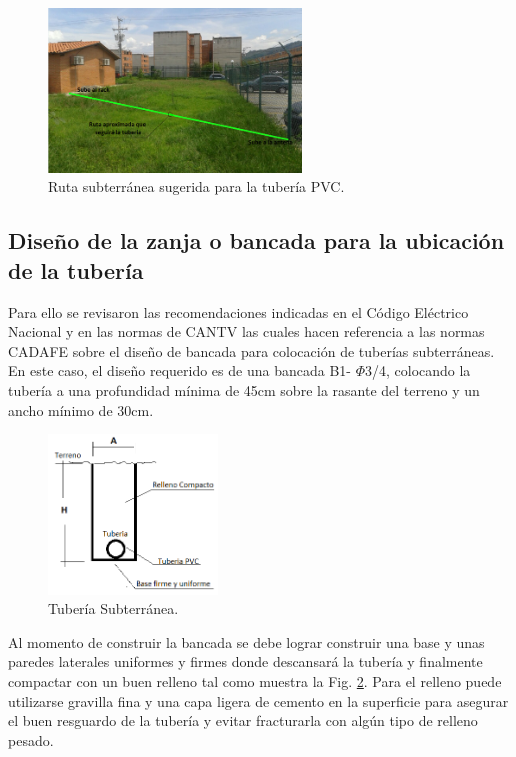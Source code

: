 \documentclass[11pt, a4paper, twosides]{report}
\begin{document}
\begin{figure}[h]
    \centering
    \includegraphics[width=0.6\textwidth]{Si1.png}
    \caption{Ruta subterránea sugerida para la tubería PVC.}
    \label{fig:frog1}
\end{figure}


\subsection{Diseño de la zanja o bancada para la ubicación de la tubería}
Para ello se revisaron las recomendaciones indicadas en el Código Eléctrico Nacional y en las normas de CANTV las cuales hacen referencia a las normas CADAFE sobre el diseño de bancada para colocación de tuberías subterráneas. En este caso, el diseño requerido es de una bancada B1- $\Phi$3/4, colocando la tubería a una profundidad mínima de 45cm sobre la rasante del terreno y un ancho mínimo de 30cm. 

\begin{figure}[h]
    \centering
    \includegraphics[width=0.4\textwidth]{Si3.png}
    \caption{Tubería Subterránea.}
    \label{fig:frog2}
\end{figure}

Al momento de construir la bancada se debe lograr construir una base y unas paredes laterales uniformes y firmes donde descansará la tubería y finalmente compactar con un buen relleno tal como muestra la Fig. \ref{fig:frog2}. Para el relleno puede utilizarse gravilla fina y una capa ligera de cemento en la superficie para asegurar el buen resguardo de la tubería y evitar fracturarla con algún tipo de relleno pesado.
\end{document}
